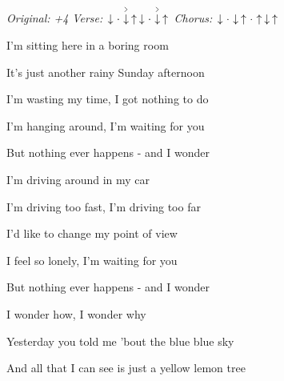 \begin{song}


\begin{headerbox}
\RaiseBoxWithAccents
\textit{Original: +4} \quad
\textit{Verse:} $\Down\Miss\AccentDown\Up \Down\Miss\AccentDown\Up$ \quad
\textit{Chorus:} $\Down\Miss\Down\Up\Miss\Up\Down\Up$
\end{headerbox}

\begin{hchordbox}
\end{hchordbox}


\bigskip

I'm sitting here in a boring room \par
It's just another rainy Sunday afternoon \par
I'm wasting my time, I got nothing to do \par
I'm hanging around, I'm waiting for you \par
But nothing ever happens -  and I wonder   \par

\bigskip

I'm driving around in my car \par
I'm driving too fast, I'm driving too far \par
I'd like to change my point of view \par
I feel so lonely, I'm waiting for you \par
But nothing ever happens -  and I wonder   \par

\bigskip

\begin{chorusbox}{\Chorus}
I wonder how, I wonder why \par
{}Yesterday you told me 'bout the blue blue sky \par
And all that I can see is just a yellow lemon tree  \par


\end{chorusbox}
\end{song}
